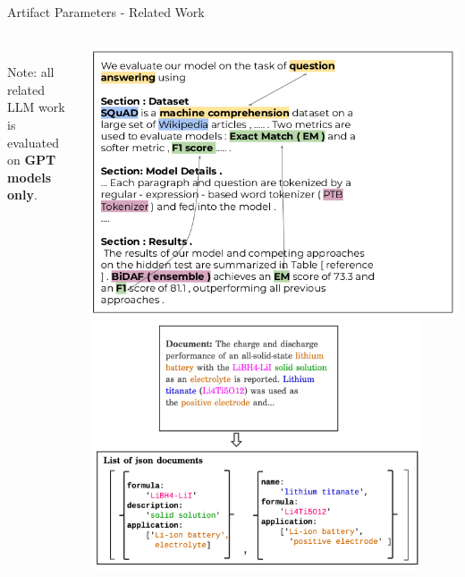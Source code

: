 \documentclass[en,16:9,smallfoot]{sdqbeamer}
\begin{document}
\begin{frame}{Artifact Parameters - Related Work}
\begin{columns}
\begin{overlayarea}{\textwidth}{4em}
{          ‌\\
          {\color{contextgrey}Note: all related LLM work is\\
          evaluated on \textbf{GPT models only}.}
          }
          \end{overlayarea}
          \begin{overprint}
               \centering\includegraphics[width=\textwidth]{imgs/scirex}
               \centering\includegraphics[width=0.9\textwidth]{imgs/llm_sciext}
          \end{overprint}
   \end{columns}
   \end{frame}
\end{document}
